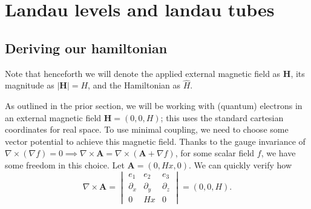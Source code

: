 \documentclass[12pt]{revtex4-2}
\begin{document}


\newpage
\section{Landau levels and landau tubes}

\subsection{Deriving our hamiltonian}

Note that henceforth we will denote the applied external magnetic field as $\mathbf{H}$, its magnitude as $|\mathbf{H}| = H$, and the Hamiltonian as $\hat{H}$.
\par

As outlined in the prior section, we will be working with (quantum) electrons in an external magnetic field $\mathbf{H} = (0,0,H)$; this uses the standard cartesian coordinates for real space.  To use minimal coupling, we need to choose some vector potential to achieve this magnetic field.  Thanks to the gauge invariance of $\nabla \times (\nabla f) = 0 \implies \nabla \times \mathbf{A} = \nabla \times (\mathbf{A} + \nabla f) $, for some scalar field $f$, we have some freedom in this choice.  Let $\mathbf{A} = (0,Hx,0)$.  We can quickly verify how
\begin{equation}
    \nabla \times \mathbf{A} = \begin{vmatrix}
        e_1 & e_2 & e_3 \\
        \partial_x & \partial_y & \partial_z \\
        0 & Hx & 0
    \end{vmatrix} = (0,0,H).
\end{equation}
\end{document}

